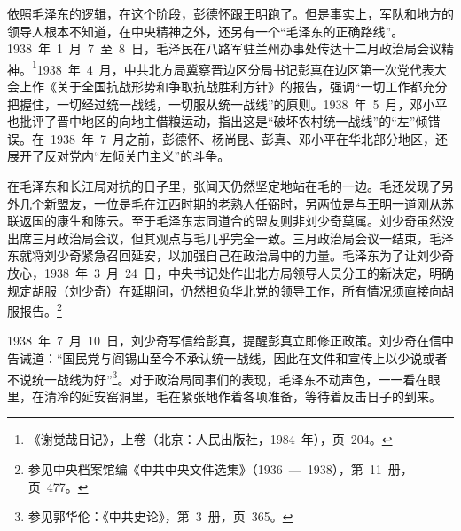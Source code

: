 依照毛泽东的逻辑，在这个阶段，彭德怀跟王明跑了。但是事实上，军队和地方的领导人根本不知道，在中央精神之外，还另有一个“毛泽东的正确路线”。1938~年~1~月~7~至~8~日，毛泽民在八路军驻兰州办事处传达十二月政治局会议精神。\footnote{《谢觉哉日记》，上卷（北京：人民出版社，1984~年），页~204。}1938~年~4~月，中共北方局冀察晋边区分局书记彭真在边区第一次党代表大会上作《关于全国抗战形势和争取抗战胜利方针》的报告，强调“一切工作都充分把握住，一切经过统一战线，一切服从统一战线”的原则。1938~年~5~月，邓小平也批评了晋中地区的向地主借粮运动，指出这是“破坏农村统一战线”的“左”倾错误。在~1938~年~7~月之前，彭德怀、杨尚昆、彭真、邓小平在华北部分地区，还展开了反对党内“左倾关门主义”的斗争。

在毛泽东和长江局对抗的日子里，张闻天仍然坚定地站在毛的一边。毛还发现了另外几个新盟友，一位是毛在江西时期的老熟人任弼时，另两位是与王明一道刚从苏联返国的康生和陈云。至于毛泽东志同道合的盟友则非刘少奇莫属。刘少奇虽然没出席三月政治局会议，但其观点与毛几乎完全一致。三月政治局会议一结束，毛泽东就将刘少奇紧急召回延安，以加强自己在政治局中的力量。毛泽东为了让刘少奇放心，1938~年~3~月~24~日，中央书记处作出北方局领导人员分工的新决定，明确规定胡服（刘少奇）在延期间，仍然担负华北党的领导工作，所有情况须直接向胡服报告。\footnote{参见中央档案馆编《中共中央文件选集》（1936~—~1938），第~11~册，页~477。}

1938~年~7~月~10~日，刘少奇写信给彭真，提醒彭真立即修正政策。刘少奇在信中告诫道：“国民党与阎锡山至今不承认统一战线，因此在文件和宣传上以少说或者不说统一战线为好”\footnote{参见郭华伦：《中共史论》，第~3~册，页~365。}。对于政治局同事们的表现，毛泽东不动声色，一一看在眼里，在清冷的延安窑洞里，毛在紧张地作着各项准备，等待着反击日子的到来。

